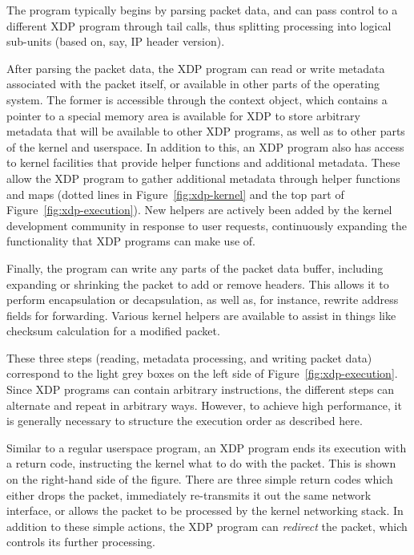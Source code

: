 \documentclass[10pt,sigconf,anonymous]{acmart}
\begin{document}
The program typically begins by parsing packet data, and can pass control to a
different XDP program through tail calls, thus splitting processing into
logical sub-units (based on, say, IP header version).

After parsing the packet data, the XDP program can read or write metadata
associated with the packet itself, or available in other parts of the operating
system. The former is accessible through the context object, which contains a
pointer to a special memory area is available for XDP to store arbitrary
metadata that will be available to other XDP programs, as well as to other parts
of the kernel and userspace. In addition to this, an XDP program also has access
to kernel facilities that provide helper functions and additional metadata.
These allow the XDP program to gather additional metadata through helper
functions and maps (dotted lines in Figure~\ref{fig:xdp-kernel} and the top part
of Figure~\ref{fig:xdp-execution}). New helpers are actively been added by the
kernel development community in response to user requests, continuously
expanding the functionality that XDP programs can make use of.

Finally, the program can write any parts of the packet data buffer, including
expanding or shrinking the packet to add or remove headers. This allows it to
perform encapsulation or decapsulation, as well as, for instance, rewrite
address fields for forwarding. Various kernel helpers are available to assist in
things like checksum calculation for a modified packet.

These three steps (reading, metadata processing, and writing packet data)
correspond to the light grey boxes on the left side of
Figure~\ref{fig:xdp-execution}. Since XDP programs can contain arbitrary
instructions, the different steps can alternate and repeat in arbitrary ways.
However, to achieve high performance, it is generally necessary to structure the
execution order as described here.

Similar to a regular userspace program, an XDP program ends its execution with a
return code, instructing the kernel what to do with the packet. This is shown on
the right-hand side of the figure. There are three simple return codes which
either drops the packet, immediately re-transmits it out the same network
interface, or allows the packet to be processed by the kernel networking stack.
In addition to these simple actions, the XDP program can \emph{redirect} the
packet, which controls its further processing.
\end{document}
